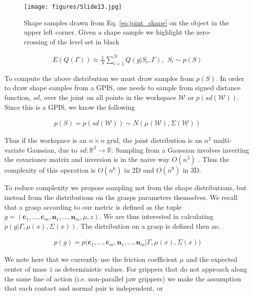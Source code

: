 \documentclass[letterpaper, 10 pt, conference]{ieeeconf}  %
\begin{document}
\begin{figure}[ht!]
\centering
\texttt{[image: figures/Slide13.jpg]}
\caption{Shape samples drawn from Eq. \ref{eq:joint_shape} on the object in the upper left corner. Given a shape sample we highlight the zero-crossing of the level set in black}
\vspace*{-10pt}
\label{fig:shape_samples}
\end{figure}

\begin{align*}
E(Q(\Gamma)) \approx \frac{1}{N} \sum_{i=1}^N Q(g|S_i,\Gamma) , \ \  S_i \sim p(S)
\end{align*}

To compute the above distribution we must draw samples from $p(S)$. In order to draw shape samples from a GPIS, one needs to sample from signed distance function, $sd$, over the joint on all points in the workspace $\mathcal{W}$ or $p(sd(\mathcal{W}))$. Since this is a GPIS, we know the following 

\begin{align}\label{eq:joint_shape}
p(S) = p(sd(\mathcal{W})) \sim N(\mu(\mathcal{W}),\Sigma(\mathcal{W}))
\end{align}

Thus if the workspace is an $n \times n$ grid, the joint distribution is an  $n^2$ multi-variate Gaussian, due to $sd:\mathbb{R}^2 \rightarrow \mathbb{R}$.  Sampling from a Gaussian involves inverting the covariance matrix and inversion is in the naive way $O(n^3)$ \cite{petersen2008matrix}. Thus the complexity of this operation is $O(n^6)$ in 2D and $O(n^9)$ in 3D. 

To reduce complexity we propose sampling not from the shape distributions, but instead from the distributions on the grasps parameters themselves. We recall that a grasp according to our metric is defined as the tuple $g = ( \textbf{c}_1,...,\textbf{c}_m,\textbf{n}_1,...,\textbf{n}_m,\mu, z )$. We are thus interested in calculating $p(g|\Gamma,\mu(x),\Sigma(x))$. The distribution on a grasp is defined then as: 

\begin{align}\label{eq:joint_on_shape}
p(g) = p\big(\textbf{c}_1,...,\textbf{c}_m,\textbf{n}_1,...,\textbf{n}_m|\Gamma,\mu(x),\Sigma(x)\big)
\end{align}

We note here that we currently use the friction coefficient $\mu$ and the expected center of mass $\bar{z}$ as deterministic values. For grippers that do not approach along the same line of action (i.e. non-parallel jaw grippers) we make the assumption that each contact and normal pair is independent, or 
\end{document}
